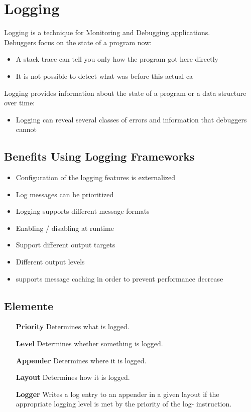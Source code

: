 \documentclass[a4paper,10pt]{article}
\newcommand{\Bold}[1]{\textbf{#1}} %
\begin{document}
\newpage
\section{Logging}
Logging is a technique for Monitoring and Debugging applications. \\
Debuggers focus on the state of a program now:
\begin{itemize}
	\item A stack trace can tell you only how the program got here directly
	\item It is not possible to detect what was before this actual ca
\end{itemize}
Logging provides information about the state of a program or a data structure over time:
\begin{itemize}
	\item Logging can reveal several classes of errors and information that debuggers cannot
\end{itemize}

\subsection{Benefits Using Logging Frameworks}
\begin{itemize}
	\item Configuration of the logging features is externalized
	\item Log messages can be prioritized
	\item Logging supports different message formats
	\item Enabling / disabling at runtime	
	\item Support different output targets
	\item Different output levels
	\item supports message caching in order to prevent performance decrease
\end{itemize}

\subsection{Elemente}
\begin{itemize}
	\item[\Bold {Priority}] Determines what is logged.
	\item[\Bold {Level}] Determines whether something is logged.
	\item[\Bold {Appender}] Determines where it is logged.
	\item[\Bold {Layout}] Determines how it is logged.
	\item[\Bold {Logger}] Writes a log entry to an appender in a given layout if the appropriate logging level is met by the priority of the log- instruction.
\end{itemize}
\end{document}
